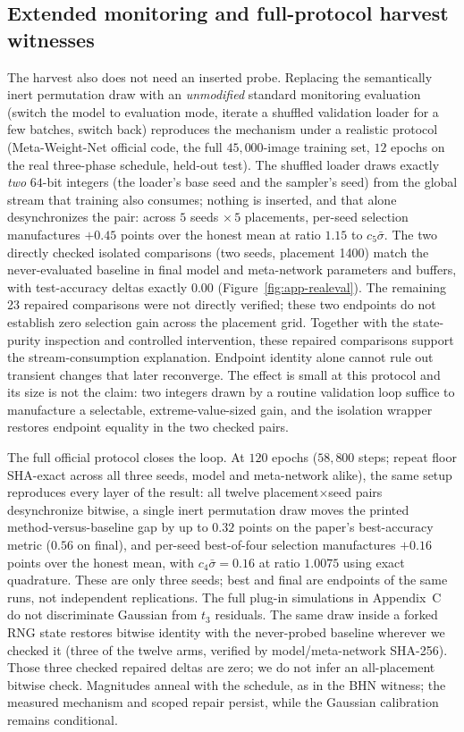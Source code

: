 \subsection{Extended monitoring and full-protocol harvest witnesses}
\label{sec:extended-harvest}

The harvest also does not need an inserted probe. Replacing the semantically
inert permutation draw with an \emph{unmodified} standard monitoring
evaluation (switch the model to evaluation mode, iterate a shuffled
validation loader for a few batches, switch back) reproduces the mechanism
under a realistic protocol (Meta-Weight-Net official code, the full
$45{,}000$-image training set, $12$ epochs on the real three-phase schedule,
held-out test). The shuffled loader draws
exactly \emph{two} $64$-bit integers (the loader's base seed and the sampler's
seed) from the global stream that training also consumes; nothing is inserted,
and that alone desynchronizes the pair: across $5$ seeds $\times\,5$ placements, per-seed
selection manufactures $+0.45$ points over the honest mean at ratio $1.15$ to
$c_5\bar\sigma$. The two directly checked isolated comparisons (two seeds,
placement 1400) match the never-evaluated baseline in final model and
meta-network parameters and buffers, with test-accuracy deltas exactly
$0.00$ (Figure~\ref{fig:app-realeval}). The remaining 23 repaired comparisons
were not directly verified; these two endpoints do not establish zero
selection gain across the placement grid. Together with
the state-purity inspection and controlled intervention, these repaired
comparisons support the stream-consumption explanation. Endpoint identity
alone cannot rule out transient changes that later reconverge. The effect is small at this
protocol and its size is not the claim: two integers drawn by a routine
validation loop suffice to manufacture a selectable, extreme-value-sized gain,
and the isolation wrapper restores endpoint equality in the two checked pairs.

The full official protocol closes the loop. At $120$ epochs ($58{,}800$
steps; repeat floor SHA-exact across all three seeds, model and
meta-network alike), the same setup reproduces every layer of the result: all twelve
placement$\times$seed pairs desynchronize bitwise, a single inert
permutation draw moves the printed method-versus-baseline gap by up
to $0.32$ points on the paper's best-accuracy metric ($0.56$ on final),
and per-seed best-of-four selection manufactures $+0.16$ points over the
honest mean,
with $c_4\bar\sigma = 0.16$ at ratio $1.0075$ using exact quadrature.
These are only three seeds; best and final are endpoints of the same runs,
not independent replications. The full plug-in simulations in Appendix~C do not
discriminate Gaussian from $t_3$ residuals. The same draw
inside a forked RNG state restores bitwise identity with the never-probed
baseline wherever we checked it (three of the twelve arms, verified by
model/meta-network SHA-256). Those three checked repaired deltas are zero;
we do not infer an all-placement bitwise check. Magnitudes anneal
with the schedule, as in the BHN witness; the measured mechanism and scoped
repair persist, while the Gaussian calibration remains conditional.


